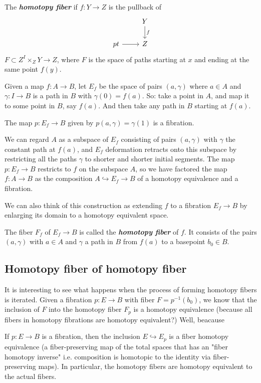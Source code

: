 \begin{defn}
	The \textbf{\textit{homotopy fiber}} if $f:Y\to Z$ is the pullback of
		\[\begin{tikzcd}
			&Y\arrow[d,"f"]\\
			pt\arrow[r]&Z
		\end{tikzcd}\]
		$F\subset Z^I\times_ZY\to Z$, where $F$ is the space of paths starting at $x$ and ending at the same point $f(y)$.
\end{defn}

\begin{defn}
	Given a map $f:A\to B$, let $E_f$ be the space of pairs $(a,\gamma)$ where $a\in A$ and $\gamma:I\to B$ is a path in $B$ with $\gamma(0)=f(a)$. {\color{blue}So: take a point in $A$, and map it to some point in $B$, say $f(a)$. And then take any path in $B$ starting at $f (a)$.}
\begin{prop}
	The map $p:E_f\to B$ given by $p(a,\gamma)=\gamma(1)$ is a fibration.
\end{prop}
We can regard $A$ as a subspace of $E_{f}$ consisting of pairs $(a,\gamma)$ with $\gamma$ the constant path at $f(a)$, and $E_f$ deformation retracts onto this subspace by restricting all the paths $\gamma$ to shorter and shorter initial segments. The map $p:E_f\to B$ restricts to $f$ on the subspace $A$, so we have factored the map $f:A\to B$ as the composition $A\hookrightarrow E_f\to B$ of a homotopy equivalence and a fibration.

We can also think of this construction as extending $f$ to a fibration $E_f\to B$ by enlarging its domain to a homotopy equivalent space.

The fiber $F_f$ of $E_f\to B$ is called the \textit{\textbf{homotopy fiber}} of $f$. It consists of the pairs $(a,\gamma)$ with $a\in A$ and $\gamma$ a path in $B$ from $f(a)$ to a basepoint $b_0\in B$.
\end{defn}

\subsection{Homotopy fiber of homotopy fiber}

It is interesting to see what happens when the process of forming homotopy fibers is iterated. Given a fibration $p:E\to B$ with fiber $F=p^{-1} (b_0)$, we know that the inclusion of $F$ into the homotopy fiber $F_{p}$ is a homotopy equivalence {\color{blue}(because all fibers in homotopy fibrations are homotopy equivalent?)} Well, beacause
\begin{prop}[4.66]
	If $p:E\to B$ is a fibration, then the inclusion $E\hookrightarrow E_p$ is a fiber homotopy equivalence (a fiber-preserving map of the total spaces that has an "fiber homotopy inverse" i.e. composition is homotopic to the identity via fiber-preserving maps). In particular, the homotopy fibers are homotopy equivalent to the actual fibers.
\end{prop}

